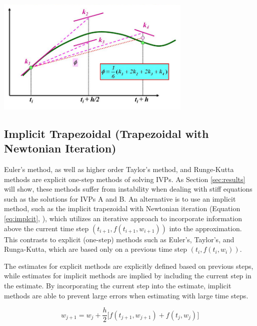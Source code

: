 \documentclass{article}
\begin{document}
\begin{center}
  \includegraphics[width=0.7\textwidth]{../additional/rk_method.png}
  \label{fig:rk4_method}
\end{center}


\subsection{Implicit Trapezoidal (Trapezoidal with Newtonian Iteration)}
\label{method:implicit}

Euler's method, as well as higher order Taylor's method, and Runge-Kutta methods are explicit one-step methods of solving IVPs. As Section \ref{sec:results} will show, these methods suffer from instability when dealing with stiff equations such as the solutions for IVPs A and B. An alternative is to use an implicit method, such as the implicit trapezoidal with Newtonian iteration (Equation \ref{eq:implcit}, \citep{burden2010}), which utilizes an iterative approach to incorporate information above the current time step $(t_{i+1}, f(t_{i+1}, w_{i+1}))$ into the approximation. This contrasts to explicit (one-step) methods such as Euler's, Taylor's, and Runga-Kutta, which are based only on a previous time step $(t_{i}, f(t_{i}, w_{i}))$. 

The estimates for explicit methods are explicitly defined based on previous steps, while estimates for implicit methods are implied by including the current step in the estimate. By incorporating the current step into the estimate, implicit methods are able to prevent large errors when estimating with large time steps.

\begin{center}
	\begin{equation}
	w_{j+1} = w_j + \frac{h}{2} \big[ f(t_{j+1}, w_{j+1}) + f(t_{j}, w_{j}) \big]
	\label{eq:implcit}
	\end{equation}
\end{center}
\end{document}
